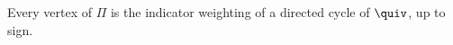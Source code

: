 
\begin{lemma}\label{sh-0407}
Every vertex of $\Pi$ is the indicator weighting of a directed cycle of $\quiv$, up to sign.
\end{lemma}
